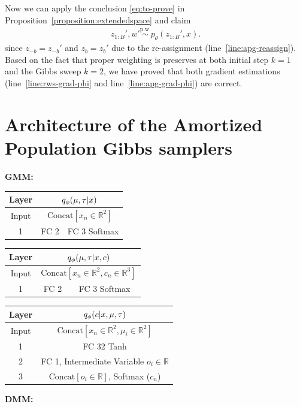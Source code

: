 \documentclass{article}
\theoremstyle{definition}
\newcommand{\pw}{\overset{\text{p.w.}}{\sim}
}
\begin{document}
Now we can apply the conclusion \eqref{eq:to-prove} in Proposition~\ref{proposition:extendedspace} and claim 
\begin{align*}
z_{1:B}', w' \pw p_\theta(z_{1:B}', x)
.
\end{align*}
since $z_{-b} = z_{-b}'$ and $z_b = z_b'$ due to the re-assignment (line~\ref{line:apg-reassign}). Based on the fact that proper weighting is preserves at both initial step $k=1$ and the Gibbs sweep $k=2$, we have proved that both gradient estimations (line~\ref{line:rws-grad-phi} and line~\ref{line:apg-grad-phi}) are correct.

\newpage
\section{Architecture of the Amortized Population Gibbs samplers}
\label{appendix:architecture}
\textbf{GMM:}
\begin{table}[!h]
    \centering
    \begin{tabular}{c|c|c}
    \toprule
     Layer 
     & 
    \multicolumn{2}{c}{$q_\phi(\mu, \tau | x)$}
    \\
    \midrule
    Input
    & 
    \multicolumn{2}{c}{$\mathrm{Concat}[x_n\in\mathbb{R}^2]$}
    \\
    \hline
    1
    & \parbox{3cm}{\centering FC 2}
    & \parbox{3cm}{\centering FC 3 Softmax}
    \\
    \bottomrule
    \end{tabular}
    \label{arch-gmm-rws}
\end{table}

\begin{table}[!h]
    \centering
    \begin{tabular}{c|c|c}
    \toprule
     Layer 
     & 
    \multicolumn{2}{c}{$q_\phi(\mu, \tau | x, c)$}
    \\
    \midrule
    Input
    & 
    \multicolumn{2}{c}{$\mathrm{Concat}[x_n\in\mathbb{R}^2, c_n\in\mathbb{R}^3]$}
    \\
    \hline
    1
    & \parbox{3cm}{\centering FC 2}
    & \parbox{3cm}{\centering FC 3 Softmax}
    \\
    \bottomrule
    \end{tabular}
    \label{arch-gmm-global}
\end{table}

\begin{table}[!h]
    \centering
    \begin{tabular}{c|c}
    \toprule
        Layer
        &
        $q_\phi(c | x, \mu, \tau)$
        \\
    \midrule
    Input
    & 
    $\mathrm{Concat}[x_n\in\mathbb{R}^2, \mu_i\in\mathbb{R}^2]$\\
    \hline
    1
    & \parbox{4cm}{\centering FC 32 Tanh}\\
    & FC 1, Intermediate Variable $o_i\in\mathbb{R}$ \\
    & $\mathrm{Concat}[o_i\in\mathbb{R}]$, Softmax ($c_n$) \\
    \bottomrule
    \end{tabular}
    \label{arch-gmm-local}
\end{table}
\textbf{DMM:}
\end{document}
